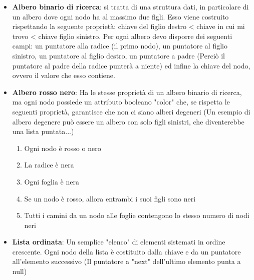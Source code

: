 \begin{itemize}
    \item \textbf{Albero binario di ricerca}: si tratta di una struttura dati, in particolare di un albero dove ogni nodo ha al massimo due figli. Esso viene costruito rispettando la seguente proprietà: chiave del figlio destro < chiave in cui mi trovo < chiave figlio sinistro. Per ogni albero devo disporre dei seguenti campi: un puntatore alla radice (il primo nodo), un puntatore al figlio sinistro, un puntatore al figlio destro, un puntatore a padre (Perciò il puntatore al padre della radice punterà a niente) ed infine la chiave del nodo, ovvero il valore che esso contiene.
    \item \textbf{Albero rosso nero}: Ha le stesse proprietà di un albero binario di ricerca, ma ogni nodo possiede un attributo booleano "color" che, se rispetta le seguenti proprietà, garantisce che non ci siano alberi degeneri (Un esempio di albero degenere può essere un albero con solo figli sinistri, che diventerebbe una lista puntata...)
    \begin{enumerate}
        \item Ogni nodo è rosso o nero
        \item La radice è nera
        \item Ogni foglia è nera
        \item Se un nodo è rosso, allora entrambi i suoi figli sono neri
        \item Tutti i camini da un nodo alle foglie contengono lo stesso numero di nodi neri
    \end{enumerate}
    \item \textbf{Lista ordinata}: Un semplice "elenco" di elementi sistemati in ordine crescente. Ogni nodo della lista è costituito dalla chiave e da un puntatore all'elemento successivo (Il puntatore a "next" dell'ultimo elemento punta a null)
\end{itemize}

